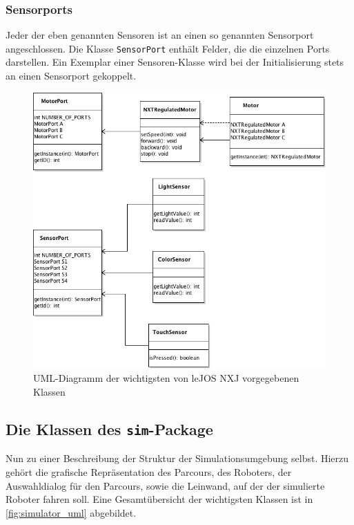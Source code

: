 \documentclass[paper=a4, pagesize, DIV=calc, BCOR=15mm, twoside=on, onecolumn=on, open = right, titlepage =on, parskip =half-, headsepline = on, footsepline = on, chapterprefix = on, appendixprefix = off, fontsize = 12pt, numbers = noenddot, abstract = on]{scrbook}
\numberwithin{equation}{chapter}
\theoremstyle{definition}
\theoremstyle{plain}
\theoremstyle{plain}
\theoremstyle{remark}
\theoremstyle{plain}
\theoremstyle{plain}
\begin{document}
\subsubsection{Sensorports}
Jeder der eben genannten Sensoren ist an einen so genannten Sensorport angeschlossen. Die Klasse \texttt{SensorPort} enthält Felder, die die einzelnen Ports darstellen. Ein Exemplar einer Sensoren-Klasse wird bei der Initialisierung stets an einen Sensorport gekoppelt. 

\begin{figure}[htpb]
\centering
\includegraphics[scale=0.65]{images/uml_api_essenz.png}
\caption{UML-Diagramm der wichtigsten von leJOS NXJ vorgegebenen Klassen}
\label{fig:api_uml}
\end{figure}

\par \singlespacing
\subsection{Die Klassen des \texttt{sim}-Package}
\onehalfspacing
Nun zu einer Beschreibung der Struktur der Simulationsumgebung selbst. Hierzu gehört die grafische Repräsentation des Parcours, des Roboters, der Auswahldialog für den Parcours, sowie die Leinwand, auf der der simulierte Roboter fahren soll. Eine Gesamtübersicht der wichtigsten Klassen ist in \ref{fig:simulator_uml} abgebildet.
\end{document}
